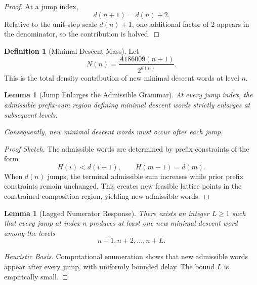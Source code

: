 \documentclass[12pt, oneside]{article}
\numberwithin{equation}{section}
\theoremstyle{definition}
\newtheorem{definition}{Definition}[section]
\theoremstyle{plain}
\newtheorem{lemma}[theorem]{Lemma}
\theoremstyle{remark}
\begin{document}
\begin{proof}
At a jump index,
\[
d(n+1)=d(n)+2.
\]
Relative to the unit-step scale $d(n)+1$, one additional factor of $2$
appears in the denominator, so the contribution is halved.
\end{proof}


\begin{definition}[Minimal Descent Mass]
Let
\[
N(n)=\frac{A186009(n+1)}{2^{d(n)}}.
\]
This is the total density contribution of new minimal descent words at
level $n$.
\end{definition}


\begin{lemma}[Jump Enlarges the Admissible Grammar]
\label{lem:jump-grammar}
At every jump index, the admissible prefix-sum region defining minimal
descent words strictly enlarges at subsequent levels.

Consequently, new minimal descent words must occur after each jump.
\end{lemma}

\begin{proof}[Proof Sketch]
The admissible words are determined by prefix constraints of the form
\[
H(i)<d(i+1), \qquad H(m-1)=d(m).
\]
When $d(n)$ jumps, the terminal admissible sum increases while prior
prefix constraints remain unchanged. This creates new feasible lattice
points in the constrained composition region, yielding new admissible
words.
\end{proof}


\begin{lemma}[Lagged Numerator Response]
\label{lem:lagged-response}
There exists an integer $L\ge1$ such that every jump at index $n$
produces at least one new minimal descent word among the levels
\[
n+1,n+2,\dots,n+L.
\]
\end{lemma}

\begin{proof}[Heuristic Basis]
Computational enumeration shows that new admissible words appear after
every jump, with uniformly bounded delay. The bound $L$ is empirically
small.
\end{proof}

\end{document}
